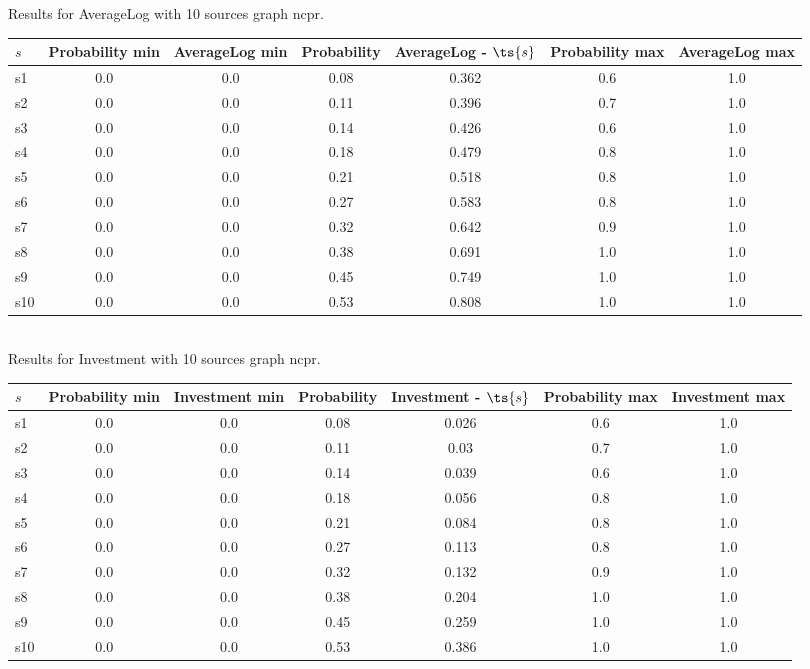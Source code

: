 \documentclass{article}
\begin{document}
\noindent Results for AverageLog with 10 sources graph ncpr.

\noindent\begin{tabular}{|l|c|c|c|c|c|c|}
\hline
$s$& Probability min & AverageLog min & Probability & AverageLog - $\ts{s}$ & Probability max & AverageLog max\\
\hline
s1 &0.0 & 0.0 & 0.08 & 0.362 & 0.6 & 1.0\\
\hline
s2 &0.0 & 0.0 & 0.11 & 0.396 & 0.7 & 1.0\\
\hline
s3 &0.0 & 0.0 & 0.14 & 0.426 & 0.6 & 1.0\\
\hline
s4 &0.0 & 0.0 & 0.18 & 0.479 & 0.8 & 1.0\\
\hline
s5 &0.0 & 0.0 & 0.21 & 0.518 & 0.8 & 1.0\\
\hline
s6 &0.0 & 0.0 & 0.27 & 0.583 & 0.8 & 1.0\\
\hline
s7 &0.0 & 0.0 & 0.32 & 0.642 & 0.9 & 1.0\\
\hline
s8 &0.0 & 0.0 & 0.38 & 0.691 & 1.0 & 1.0\\
\hline
s9 &0.0 & 0.0 & 0.45 & 0.749 & 1.0 & 1.0\\
\hline
s10 &0.0 & 0.0 & 0.53 & 0.808 & 1.0 & 1.0\\
\hline
\end{tabular}\\

\noindent Results for Investment with 10 sources graph ncpr.

\noindent\begin{tabular}{|l|c|c|c|c|c|c|}
\hline
$s$& Probability min & Investment min & Probability & Investment - $\ts{s}$ & Probability max & Investment max\\
\hline
s1 &0.0 & 0.0 & 0.08 & 0.026 & 0.6 & 1.0\\
\hline
s2 &0.0 & 0.0 & 0.11 & 0.03 & 0.7 & 1.0\\
\hline
s3 &0.0 & 0.0 & 0.14 & 0.039 & 0.6 & 1.0\\
\hline
s4 &0.0 & 0.0 & 0.18 & 0.056 & 0.8 & 1.0\\
\hline
s5 &0.0 & 0.0 & 0.21 & 0.084 & 0.8 & 1.0\\
\hline
s6 &0.0 & 0.0 & 0.27 & 0.113 & 0.8 & 1.0\\
\hline
s7 &0.0 & 0.0 & 0.32 & 0.132 & 0.9 & 1.0\\
\hline
s8 &0.0 & 0.0 & 0.38 & 0.204 & 1.0 & 1.0\\
\hline
s9 &0.0 & 0.0 & 0.45 & 0.259 & 1.0 & 1.0\\
\hline
s10 &0.0 & 0.0 & 0.53 & 0.386 & 1.0 & 1.0\\
\hline
\end{tabular}\\
\end{document}
